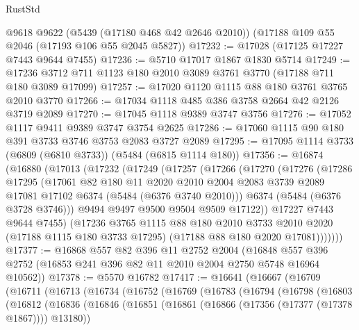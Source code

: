 \begin{lexlean}{RustStd}
\begin{coremodule}
    @9618
    @9622
    (@5439 (@17180 @468 @42 @2646 @2010))
    (@17188 @109 @55 @2046 (@17193 @106 @55 @2045 @5827))
@17232 := @17028 (@17125 @17227 @7443 @9644 @7455)
@17236 := @5710 @17017 @1867 @1830 @5714
@17249 := @17236 @3712 @711 @1123 @180 @2010 @3089 @3761 @3770 (@17188 @711 @180 @3089 @17099)
@17257 := @17020 @1120 @1115 @88 @180 @3761 @3765 @2010 @3770
@17266 := @17034 @1118 @485 @386 @3758 @2664 @42 @2126 @3719 @2089
@17270 := @17045 @1118 @9389 @3747 @3756
@17276 := @17052 @1117 @9411 @9389 @3747 @3754 @2625
@17286 := @17060 @1115 @90 @180 @391 @3733 @3746 @3753 @2083 @3727 @2089
@17295 := @17095 @1114 @3733 (@6809 (@6810 @3733)) (@5484 (@6815 @1114 @180))
@17356 := @16874
    (@16880
      (@17013
        (@17232
          (@17249
            (@17257
              (@17266
                (@17270
                  (@17276
                    (@17286
                      @17295
                      (@17061
                        @82
                        @180
                        @11
                        @2020
                        @2010
                        @2004
                        @2083
                        @3739
                        @2089
                        @17081
                        @17102
                        @6374
                        (@5484 (@6376 @3740 @2010)))
                      @6374
                      (@5484 (@6376 @3728 @3746)))
                    @9494
                    @9497
                    @9500
                    @9504
                    @9509
                    @17122))
                @17227
                @7443
                @9644
                @7455)
              (@17236
                @3765
                @1115
                @88
                @180
                @2010
                @3733
                @2010
                @2020
                (@17188 @1115 @180 @3733 @17295)
                (@17188 @88 @180 @2020 @17081)))))))
@17377 := @16868
    @557
    @82
    @396
    @11
    @2752
    @2004
    (@16848 @557 @396 @2752 (@16853 @241 @396 @82 @11 @2010 @2004 @2750 @5748 @16964 @10562))
@17378 := @5570 @16782
@17417 := @16641
    (@16667
      (@16709
        (@16711
          (@16713
            (@16734
              (@16752
                (@16769
                  (@16783
                    (@16794
                      (@16798
                        (@16803
                          (@16812
                            (@16836
                              (@16846
                                (@16851 (@16861 (@16866 (@17356 (@17377 (@17378 @1867)))) @13180))

\end{coremodule}
\end{lexlean}
